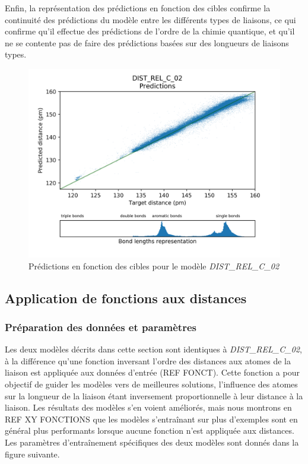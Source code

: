 \par Enfin, la représentation des prédictions en fonction des cibles confirme la continuité des prédictions du modèle entre les différents types de liaisons, ce qui confirme qu'il effectue des prédictions de l'ordre de la chimie quantique, et qu'il ne se contente pas de faire des prédictions basées sur des longueurs de liaisons types.
\begin{figure}[!h]
	\centering
	
	\includegraphics[scale=0.7]{../figures/DIST_REL_C_02/DIST_REL_C_02_preds_targets.png}	
	
	\caption{Prédictions en fonction des cibles pour le modèle \emph{DIST\_REL\_C\_02}}
	
\end{figure}

\subsection{Application de fonctions aux distances}

\subsubsection{Préparation des données et paramètres}
Les deux modèles décrits dans cette section sont identiques à \emph{DIST\_REL\_C\_02}, à la différence qu'une fonction inversant l'ordre des distances aux atomes de la liaison est appliquée aux données d'entrée (REF FONCT). Cette fonction a pour objectif de guider les modèles vers de meilleures solutions, l'influence des atomes sur la longueur de la liaison étant inversement proportionnelle à leur distance à la liaison. Les résultats des modèles s'en voient améliorés, mais nous montrons en REF XY FONCTIONS que les modèles s'entraînant sur plus d'exemples sont en général plus performants lorsque aucune fonction n'est appliquée aux distances.\\
Les paramètres d'entraînement spécifiques des deux modèles sont donnés dans la figure suivante.

